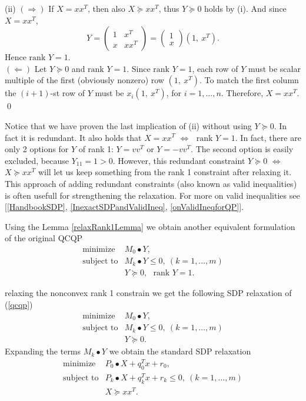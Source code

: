 \documentclass[12pt]{book}
\theoremstyle{definition}
\begin{document}
(ii) $(\Rightarrow)$ If $X=xx^T$, then also $X\succeq xx^T$, thus $Y\succeq 0$ holds by (i). And since $X=xx^T$,
$$Y=\left(
\begin{array}{cc}
1 & x^T\\
x & xx^T
\end{array}\right)
=  \left(\begin{array}{c}
1\\
x
\end{array}\right)
(1,\ x^T).
$$
Hence $\mbox{rank } Y=1$.\\
$(\Leftarrow)$ Let $Y\succeq 0$ and $\mbox{rank } Y=1$. Since $\mbox{rank } Y=1$, each row of $Y$ must be scalar multiple of the first (obviously nonzero) row $(1,\ x^T)$. To match the first column the $(i+1)$-st row of $Y$ must be $x_i(1,\ x^T)$, for $i=1,\dots , n$.
Therefore, $X=xx^T.$
\qed

\rem Notice that we have proven the last implication of (ii) without using $Y\succeq 0$. In fact it is redundant. It also holds that $X=xx^T$ $\Leftrightarrow$ $\mbox{ rank } Y=1$. In fact, there are only 2 options for $Y$ of rank 1: $Y = vv^T$ or $Y = -vv^T$. The second option is easily excluded, because $Y_{11}=1>0$. However, this redundant constraint $Y\succeq 0$ $\Leftrightarrow$ $X\succeq xx^T$ will 
let us keep something from the rank 1 constraint after relaxing it. This approach of adding redundant constraints (also known as valid inequalities) is often usefull for strengthening the relaxation. For more on valid inequalities see [\ref{HandbookSDP}, \ref{InexactSDPandValidIneq}, \ref{onValidIneqforQP}].




Using the Lemma \ref{relaxRank1Lemma} we obtain another equivalent formulation of the original QCQP
\begin{equation} 
\label{3rdStepToSDPr}
\begin{array}{ll}
\mbox{minimize}& M_0\bullet Y ,\\
\mbox{subject to}& M_k\bullet Y \leq 0, \  (k = 1,\dots ,m)\\
& Y\succeq 0, \ \ \ \mbox{rank }Y = 1.
\end{array} 
\end{equation}

 relaxing the nonconvex rank 1 constrain we get the following SDP relaxation of (\ref{qcqp})
\begin{equation} 
\label{SDPrelax1}
\begin{array}{ll}
\mbox{minimize}& M_0\bullet Y, \\
\mbox{subject to}& M_k\bullet Y \leq 0, \  (k = 1,\dots ,m)\\
& Y\succeq 0.
\end{array} 
\end{equation}
Expanding the terms $M_k\bullet Y$ we obtain the standard SDP relaxation
\begin{equation}
\label{SDPrelax2} 
\begin{array}{ll}
\mbox{minimize}& P_0\bullet X + q_0^Tx + r_0,\\
\mbox{subject to}& P_k\bullet X+ q_k^Tx + r_k \leq 0, \  (k = 1,\dots ,m)\\
& X\succeq xx^T.
\end{array} 
\end{equation}
\end{document}
